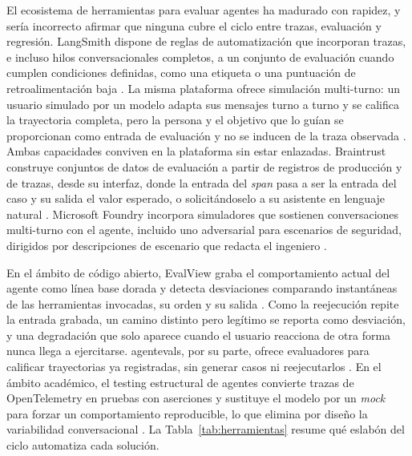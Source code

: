 El ecosistema de herramientas para evaluar agentes ha madurado con rapidez, y sería incorrecto afirmar que ninguna cubre el ciclo entre trazas, evaluación y regresión. LangSmith dispone de reglas de automatización que incorporan trazas, e incluso hilos conversacionales completos, a un conjunto de evaluación cuando cumplen condiciones definidas, como una etiqueta o una puntuación de retroalimentación baja \cite{langsmith2026eval}. La misma plataforma ofrece simulación multi-turno: un usuario simulado por un modelo adapta sus mensajes turno a turno y se califica la trayectoria completa, pero la persona y el objetivo que lo guían se proporcionan como entrada de evaluación y no se inducen de la traza observada \cite{langsmith2026multiturn}. Ambas capacidades conviven en la plataforma sin estar enlazadas. Braintrust construye conjuntos de datos de evaluación a partir de registros de producción y de trazas, desde su interfaz, donde la entrada del \textit{span} pasa a ser la entrada del caso y su salida el valor esperado, o solicitándoselo a su asistente en lenguaje natural \cite{braintrust2026datasets}. Microsoft Foundry incorpora simuladores que sostienen conversaciones multi-turno con el agente, incluido uno adversarial para escenarios de seguridad, dirigidos por descripciones de escenario que redacta el ingeniero \cite{microsoft2026foundry}.
\par\vspace{6pt}
En el ámbito de código abierto, EvalView graba el comportamiento actual del agente como línea base dorada y detecta desviaciones comparando instantáneas de las herramientas invocadas, su orden y su salida \cite{evalview}. Como la reejecución repite la entrada grabada, un camino distinto pero legítimo se reporta como desviación, y una degradación que solo aparece cuando el usuario reacciona de otra forma nunca llega a ejercitarse. agentevals, por su parte, ofrece evaluadores para calificar trayectorias ya registradas, sin generar casos ni reejecutarlos \cite{agentevals}. En el ámbito académico, el testing estructural de agentes convierte trazas de OpenTelemetry en pruebas con aserciones y sustituye el modelo por un \textit{mock} para forzar un comportamiento reproducible, lo que elimina por diseño la variabilidad conversacional \cite{kohl2026structural}. La Tabla~\ref{tab:herramientas} resume qué eslabón del ciclo automatiza cada solución.
\par

